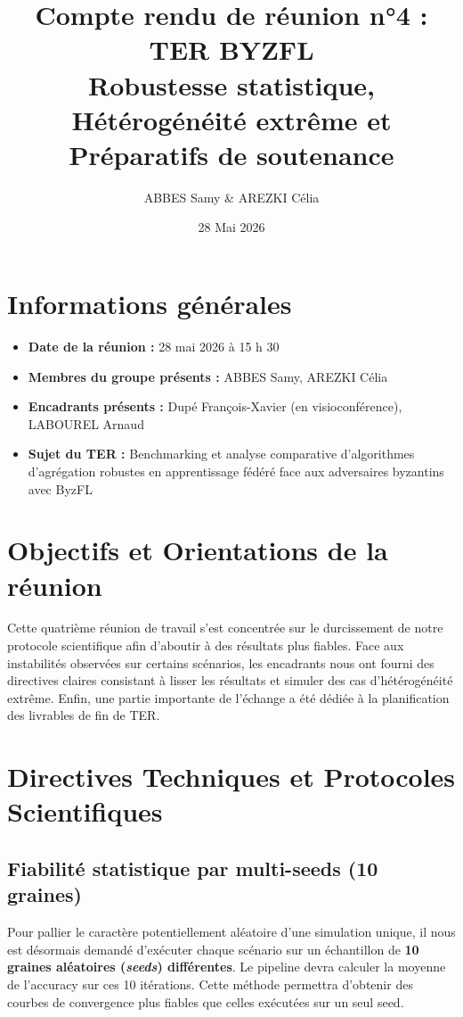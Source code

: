 \documentclass[11pt, a4paper]{article}
\title{\textbf{Compte rendu de réunion n°4 : TER BYZFL} \\ \large Robustesse statistique, Hétérogénéité extrême et Préparatifs de soutenance}
\author{ABBES Samy \& AREZKI Célia}
\date{28 Mai 2026}
\begin{document}
\maketitle

\section*{Informations générales}
\begin{itemize}
    \item \textbf{Date de la réunion :} 28 mai 2026 à 15 h 30
    \item \textbf{Membres du groupe présents :} ABBES Samy, AREZKI Célia
    \item \textbf{Encadrants présents :} Dupé François-Xavier (en visioconférence), LABOUREL Arnaud
    \item \textbf{Sujet du TER :} Benchmarking et analyse comparative d'algorithmes d'agrégation robustes en apprentissage fédéré face aux adversaires byzantins avec ByzFL
\end{itemize}

\section{Objectifs et Orientations de la réunion}
Cette quatrième réunion de travail s'est concentrée sur le durcissement de notre protocole scientifique afin d'aboutir à des résultats plus fiables. Face aux instabilités observées sur certains scénarios, les encadrants nous ont fourni des directives claires consistant à lisser les résultats et simuler des cas d'hétérogénéité extrême. Enfin, une partie importante de l'échange a été dédiée à la planification des livrables de fin de TER.

\section{Directives Techniques et Protocoles Scientifiques}

\subsection{Fiabilité statistique par multi-seeds (10 graines)}
Pour pallier le caractère potentiellement aléatoire d'une simulation unique, il nous est désormais demandé d'exécuter chaque scénario sur un échantillon de \textbf{10 graines aléatoires (\textit{seeds}) différentes}. Le pipeline devra calculer la moyenne de l'accuracy sur ces 10 itérations. Cette méthode permettra d'obtenir des courbes de convergence plus fiables que celles exécutées sur un seul seed.
\end{document}
